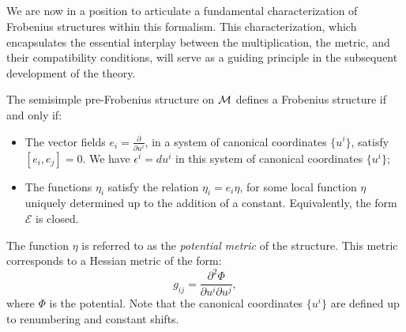 \subsection{}
We are now in a position to articulate a fundamental characterization of Frobenius structures within this formalism. This characterization, which encapsulates the essential interplay between the multiplication, the metric, and their compatibility conditions, will serve as a guiding principle in the subsequent development of the theory.

\begin{theorem}
\label{thm:3.3}
The semisimple pre-Frobenius structure on $\mathcal{M}$ defines a Frobenius structure if and only if:
\begin{itemize}
    \item The vector fields $e_i = \frac{\partial}{\partial u^i}$, in a system of canonical coordinates $\{u^i\}$, satisfy $[e_i, e_j] = 0$. We have $\epsilon^i = du^i$ in this system of canonical coordinates $\{u^i\}$;
    \item The functions $\eta_i$ satisfy the relation
$\eta_i = e_i \eta$, for some local function $\eta$ uniquely determined up to the addition of a constant. Equivalently, the form $\mathcal{E}$ is closed.
\end{itemize}
\end{theorem}

The function $\eta$ is referred to as the \textit{potential metric} of the structure. This metric corresponds to a Hessian metric of the form:
\[
g_{ij} = \frac{\partial^2 \Phi}{\partial u^i \partial u^j},
\]
where $\Phi$ is the potential. Note that the canonical coordinates $\{u^i\}$ are defined up to renumbering and constant shifts.

